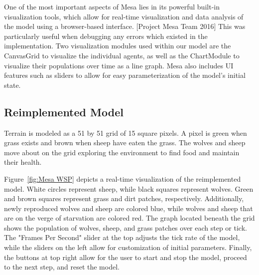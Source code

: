 \begin{multicols}{2}
    One of the most important aspects of Mesa lies in its powerful built-in
    visualization tools, which allow for real-time visualization and data analysis
    of the model using a browser-based interface. [Project Mesa Team 2016]
    This was particularly useful when debugging any errors which existed in the
    implementation.
    Two visualization modules used within our model are the CanvasGrid to visualize the
    individual agents, as well as the ChartModule to visualize their populations over
    time as a line graph.
    Mesa also includes UI features such as sliders to allow for easy parameterization
    of the model's initial state.


\subsection{Reimplemented Model}\label{subsec:reimplemented-model}
    Terrain is modeled as a 51 by 51 grid of 15 square pixels.
    A pixel is green when grass exists and brown when sheep have eaten the grass.
    The wolves and sheep move about on the grid exploring the environment to find
    food and maintain their health.

    Figure~\ref{fig:Mesa WSP} depicts a real-time visualization of the reimplemented model.
    White circles represent sheep, while black squares represent wolves.
    Green and brown squares represent grass and dirt patches, respectively.
    Additionally, newly reproduced wolves and sheep are colored blue,
    while wolves and sheep that are on the verge of starvation are colored red.
    The graph located beneath the grid shows the population of wolves, sheep,
    and grass patches over each step or tick.
    The "Frames Per Second" slider at the top adjusts the tick rate of the model,
    while the sliders on the left allow for customization of initial parameters.
    Finally, the buttons at top right allow for the user to start and stop the model,
    proceed to the next step, and reset the model.


\end{multicols}
